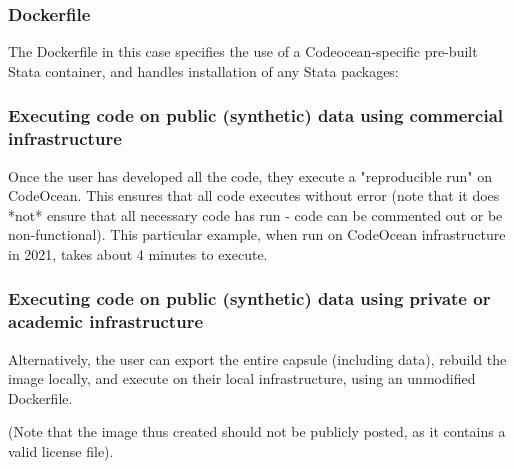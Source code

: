 \documentclass[]{hdsr}
\begin{document}




\subsubsection{Dockerfile}

The Dockerfile in this case specifies the use of a Codeocean-specific pre-built Stata container, and handles installation of any Stata packages:



\subsubsection{Executing code on public (synthetic) data using commercial infrastructure}

Once the user has developed all the code, they execute a "reproducible run" on CodeOcean. This ensures that all code executes without error (note that it does *not* ensure that all necessary code has run - code can be commented out or be non-functional). This particular example, when run on CodeOcean infrastructure in 2021, takes about 4 minutes to execute.

\subsubsection{Executing code on public (synthetic) data using private or academic infrastructure}

Alternatively, the user can export the entire capsule (including data), rebuild the image locally, and execute on their local infrastructure, using an unmodified Dockerfile.


%
(Note that the image thus created should not be publicly posted, as it contains a valid license file).
\end{document}
